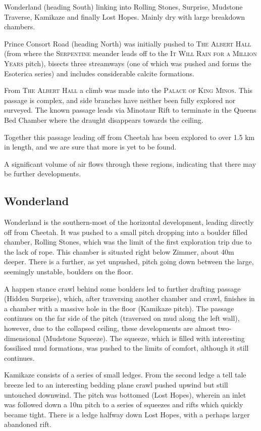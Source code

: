 Wonderland (heading South) linking into Rolling Stones, Surprise,
Mudstone Traverse, Kamikaze and finally Lost Hopes. Mainly dry with
large breakdown chambers.

Prince Consort Road (heading North) was initially pushed to
\textsc{The Albert
Hall} (from where the \textsc{Serpentine} meander leads off to the
\textsc{It
Will Rain for a Million Years} pitch), bisects three streamways (one of
which was pushed and forms the Esoterica series) and includes
considerable calcite formations.

From \textsc{The Albert Hall} a climb was made into the
\textsc{Palace of King Minos}. This passage is complex, and side
branches have neither been fully explored nor surveyed. The known
passage leads via Minotaur Rift to terminate in the Queens Bed Chamber
where the draught disappears towards the ceiling.

Together this passage leading off from Cheetah has been explored to over
1.5 km in length, and we are sure that more is yet to be found.

A significant volume of air flows through these regions, indicating that
there may be further developments.

\subsection{Wonderland}

Wonderland is the southern-most of the horizontal development, leading
directly off from Cheetah. It was pushed to a small pitch dropping into
a boulder filled chamber, Rolling Stones, which was the limit of the
first exploration trip due to the lack of rope. This chamber is situated
right below Zimmer, about 40m deeper. There is a further, as yet
unpushed, pitch going down between the large, seemingly unstable,
boulders on the floor.

A happen stance crawl behind some boulders led to further drafting
passage (Hidden Surprise), which, after traversing another chamber and
crawl, finishes in a chamber with a massive hole in the floor (Kamikaze
pitch). The passage continues on the far side of the pitch (traversed on
mud along the left wall), however, due to the collapsed ceiling, these
developments are almost two-dimensional (Mudstone Squeeze). The squeeze,
which is filled with interesting fossilised mud formations, was pushed
to the limits of comfort, although it still continues.

Kamikaze consists of a series of small ledges. From the second ledge a
tell tale breeze led to an interesting bedding plane crawl pushed upwind
but still untouched downwind. The pitch was bottomed (Lost Hopes),
wherein an inlet was followed down a 10m pitch to a series of squeezes
and rifts which quickly became tight. There is a ledge halfway down Lost
Hopes, with a perhaps larger abandoned rift.

